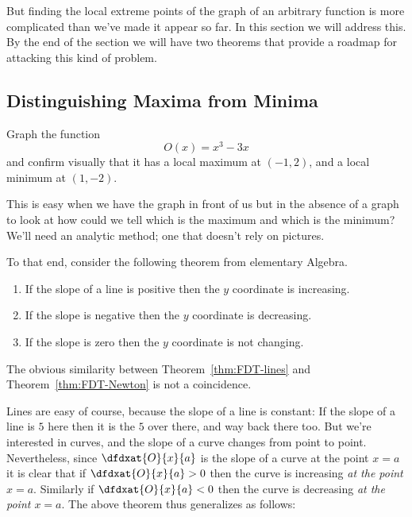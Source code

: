 But finding the local extreme points of the graph of an arbitrary function
is more complicated than we've made it appear so far. In this section
we will address this. By the end of the section we will have two
theorems that provide a roadmap for attacking this kind of problem.

\subsection{Distinguishing Maxima from Minima}
Graph the function
$$
O(x)=x^3-3x
$$
and confirm visually that it has a local maximum at $(-1, 2)$, and a
local minimum at $(1,-2)$.

This is easy when we have the graph in front of us
but in the absence of a graph to look at how could we tell which is
the maximum and which is the minimum? We'll need an \alert{analytic}
method; one that doesn't rely on pictures.


To that end, consider the following theorem from elementary Algebra.

\begin{mytheorem-enumerate-noname}
  \label{thm:FDT-lines}
  \begin{enumerate}
  \item If the slope of a line is positive then the $y$ coordinate is
    increasing.
  \item If the slope is negative then the $y$ coordinate is
    decreasing.
  \item If the slope is zero then the $y$ coordinate is not changing.
  \end{enumerate}
\end{mytheorem-enumerate-noname}

The obvious similarity between Theorem~\ref{thm:FDT-lines} and
Theorem~\ref{thm:FDT-Newton} is not a coincidence.

Lines are easy of course, because the slope of a line is constant: If
the slope of a line is $5$ here then it is the $5$ over
there, and way back there too. But we're interested in curves, and the slope of a curve
changes from point to point. Nevertheless, since $\dfdxat{O}{x}{a}$
is the slope of a curve at the point $x=a$ it is clear that if
$\dfdxat{O}{x}{a}>0$ then the curve is increasing \emph{at the point
  $x=a.$} Similarly if $\dfdxat{O}{x}{a}<0$ then the curve is
decreasing \emph{at the point $x=a.$} The above theorem thus
generalizes as follows:


